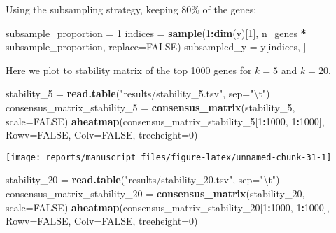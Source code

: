 \documentclass[9pt,a4paper,]{extarticle}
\newenvironment{Shaded}{\begin{snugshade}}{\end{snugshade}}
\newcommand{\CharTok}[1]{\textcolor[rgb]{0.31,0.60,0.02}{#1}}
\newcommand{\DataTypeTok}[1]{\textcolor[rgb]{0.13,0.29,0.53}{#1}}
\newcommand{\DecValTok}[1]{\textcolor[rgb]{0.00,0.00,0.81}{#1}}
\newcommand{\KeywordTok}[1]{\textcolor[rgb]{0.13,0.29,0.53}{\textbf{#1}}}
\newcommand{\NormalTok}[1]{#1}
\newcommand{\OperatorTok}[1]{\textcolor[rgb]{0.81,0.36,0.00}{\textbf{#1}}}
\newcommand{\OtherTok}[1]{\textcolor[rgb]{0.56,0.35,0.01}{#1}}
\newcommand{\StringTok}[1]{\textcolor[rgb]{0.31,0.60,0.02}{#1}}
\begin{document}
Using the subsampling strategy, keeping 80\% of the genes:

\begin{Shaded}
\begin{Highlighting}[]
\NormalTok{subsample_proportion =}\StringTok{ }\DecValTok{1}
\NormalTok{indices =}\StringTok{ }\KeywordTok{sample}\NormalTok{(}\DecValTok{1}\OperatorTok{:}\KeywordTok{dim}\NormalTok{(y)[}\DecValTok{1}\NormalTok{], n_genes }\OperatorTok{*}\StringTok{ }\NormalTok{subsample_proportion, }\DataTypeTok{replace=}\OtherTok{FALSE}\NormalTok{)}
\NormalTok{subsampled_y =}\StringTok{ }\NormalTok{y[indices, ]}
\end{Highlighting}
\end{Shaded}

Here we plot to stability matrix of the top 1000 genes for \(k=5\) and \(k=20\).

\begin{Shaded}
\begin{Highlighting}[]
\NormalTok{stability_}\DecValTok{5}\NormalTok{ =}\StringTok{ }\KeywordTok{read.table}\NormalTok{(}\StringTok{"results/stability_5.tsv"}\NormalTok{, }\DataTypeTok{sep=}\StringTok{"}\CharTok{\textbackslash{}t}\StringTok{"}\NormalTok{)}
\NormalTok{consensus_matrix_stability_}\DecValTok{5}\NormalTok{ =}\StringTok{ }\KeywordTok{consensus_matrix}\NormalTok{(stability_}\DecValTok{5}\NormalTok{,}
                            \DataTypeTok{scale=}\OtherTok{FALSE}\NormalTok{)}
\KeywordTok{aheatmap}\NormalTok{(consensus_matrix_stability_}\DecValTok{5}\NormalTok{[}\DecValTok{1}\OperatorTok{:}\DecValTok{1000}\NormalTok{, }\DecValTok{1}\OperatorTok{:}\DecValTok{1000}\NormalTok{], }\DataTypeTok{Rowv=}\OtherTok{FALSE}\NormalTok{,}
     \DataTypeTok{Colv=}\OtherTok{FALSE}\NormalTok{,}
     \DataTypeTok{treeheight=}\DecValTok{0}\NormalTok{)}
\end{Highlighting}
\end{Shaded}

\begin{center}\texttt{[image: reports/manuscript\_files/figure-latex/unnamed-chunk-31-1]} \end{center}

\begin{Shaded}
\begin{Highlighting}[]
\NormalTok{stability_}\DecValTok{20}\NormalTok{ =}\StringTok{ }\KeywordTok{read.table}\NormalTok{(}\StringTok{"results/stability_20.tsv"}\NormalTok{, }\DataTypeTok{sep=}\StringTok{"}\CharTok{\textbackslash{}t}\StringTok{"}\NormalTok{)}
\NormalTok{consensus_matrix_stability_}\DecValTok{20}\NormalTok{ =}\StringTok{ }\KeywordTok{consensus_matrix}\NormalTok{(stability_}\DecValTok{20}\NormalTok{,}
                         \DataTypeTok{scale=}\OtherTok{FALSE}\NormalTok{)}
\KeywordTok{aheatmap}\NormalTok{(consensus_matrix_stability_}\DecValTok{20}\NormalTok{[}\DecValTok{1}\OperatorTok{:}\DecValTok{1000}\NormalTok{, }\DecValTok{1}\OperatorTok{:}\DecValTok{1000}\NormalTok{], }\DataTypeTok{Rowv=}\OtherTok{FALSE}\NormalTok{,}
     \DataTypeTok{Colv=}\OtherTok{FALSE}\NormalTok{,}
     \DataTypeTok{treeheight=}\DecValTok{0}\NormalTok{)}
\end{Highlighting}
\end{Shaded}
\end{document}
